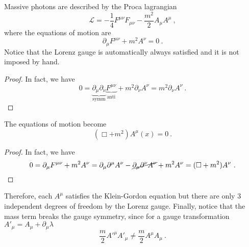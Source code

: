     Massive photons are described by the Proca lagrangian
    \begin{equation*}
        \mathcal L = - \frac{1}{4} F^{\mu\nu} F_{\mu\nu} - \frac{m^2}{2} A_\mu A^\mu ~,
    \end{equation*}
    where the equations of motion are 
    \begin{equation*}
        \partial_\mu F^{\mu\nu} + m^2 A^\nu = 0~.
    \end{equation*}
    Notice that the Lorenz gauge is automatically always satisfied and it is not imposed by hand.
    \begin{proof}
        In fact, we have
        \begin{equation}
            0 = \underbrace{\partial_\mu \partial_\nu}_{\text{symm}} \underbrace{F^{\mu\nu}}_{\text{anti}} + m^2 \partial_\nu A^\nu = m^2 \partial_\nu A^\nu ~.
        \end{equation}
    \end{proof}
    The equations of motion become
    \begin{equation*}
        (\Box + m^2) A^\mu (x) = 0 ~.
    \end{equation*}
    \begin{proof}
        In fact, we have
        \begin{equation*}
            0 = \partial_\mu F^{\mu\nu} + m^2 A^\nu = \partial_\mu \partial^\mu A^\nu - \cancel{\partial_\mu \partial^\nu A^\nu} + m^2 A^\nu = (\Box + m^2) A^\nu ~.
        \end{equation*}
    \end{proof}
    Therefore, each $A^\mu$ satisfies the Klein-Gordon equation but there are only $3$ independent degrees of freedom by the Lorenz gauge. Finally, notice that the mass term breaks the gauge symmetry, since for a gauge transformation ${A'}_\mu = A_\mu + \partial_\mu \lambda$
    \begin{equation*}
        \frac{m}{2} {A'}^\mu {A'}_\mu \neq \frac{m}{2} A^\mu A_\mu ~.
    \end{equation*}
